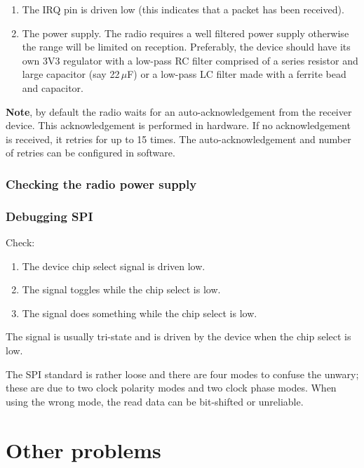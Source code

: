 \begin{enumerate}
\item
  The IRQ pin is driven low (this indicates that a packet has been
  received).
\item
  The power supply. The radio requires a well filtered power supply
  otherwise the range will be limited on reception. Preferably, the
  device should have its own 3V3 regulator with a low-pass RC filter
  comprised of a series resistor and large capacitor (say 22\,$\mu$F) or a
  low-pass LC filter made with a ferrite bead and capacitor.
\end{enumerate}

\textbf{Note}, by default the radio waits for an auto-acknowledgement
from the receiver device. This acknowledgement is performed in hardware.
If no acknowledgement is received, it retries for up to 15 times. The
auto-acknowledgement and number of retries can be configured in
software.

\subsubsection{Checking the radio power supply}
\label{checking-the-radio-power-supply}


\subsubsection{Debugging SPI}
\label{debugging-spi}

Check:
%
\begin{enumerate}
\item The device chip select signal is driven low.
\item The  signal toggles while the chip select is low.
\item The  signal does something while the chip select is low.
\end{enumerate}
%
The  signal is usually tri-state and is driven by the
device when the chip select is low.

The SPI standard is rather loose and there are four modes to confuse
the unwary; these are due to two clock polarity modes and two clock
phase modes.  When using the wrong mode, the read data can be
bit-shifted or unreliable.


\section{Other problems}
\label{faq}


